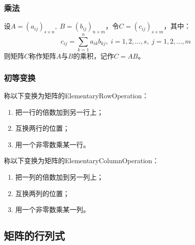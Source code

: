 \subsubsection{乘法}
\begin{definition}
	设$A=(a_{ij})_{s\times n},\;B=(b_{ij})_{n\times m}$，令$C=(c_{ij})_{s\times m}$，其中：
	\begin{equation*}
		c_{ij}=\sum_{k=1}^{n}a_{ik}b_{kj},\;i=1,2,\dots,s,\;j=1,2,\dots,m
	\end{equation*}
	则矩阵$C$称作矩阵$A$与$B$的乘积，记作$C=AB$。
\end{definition}
\subsubsection{初等变换}
\begin{definition}
	称以下变换为矩阵的\gls{ElementaryRowOperation}：
	\begin{enumerate}
		\item 把一行的倍数加到另一行上；
		\item 互换两行的位置；
		\item 用一个非零数乘某一行。
	\end{enumerate}
	称以下变换为矩阵的\gls{ElementaryColumnOperation}：
	\begin{enumerate}
		\item 把一列的倍数加到另一列上；
		\item 互换两列的位置；
		\item 用一个非零数乘某一列。
	\end{enumerate}
\end{definition}
\subsection{矩阵的行列式}

